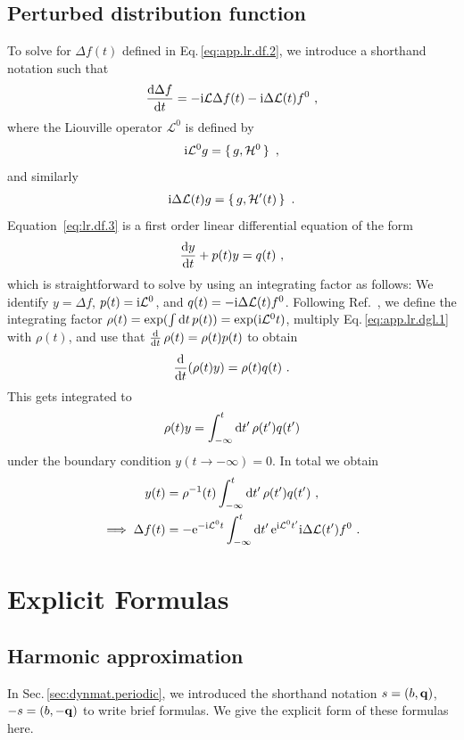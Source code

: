 \section{Perturbed distribution function}
\label{app:lr.f}
To solve for $\Delta f(t)$ defined in Eq.\,\eqref{eq:app.lr.df.2}, we introduce a shorthand notation such that
%
\begin{align}
  \frac{\d \Delta f}{\d t} = -\im \mathcal L \Delta f(t) - \im \Delta \mathcal L (t) f^0~,
  \label{eq:lr.df.3}
\end{align}
where the Liouville operator $\mathcal L^0$ is defined by
%
\begin{align}
	\im \mathcal  L^0 g = \set{g, \mathcal H^0}~,
	\label{eq:app.lr.L}
\end{align}
%
and similarly
\begin{align}
	\im \Delta \mathcal L (t) g = \set{g, \mathcal H'(t)}~.
	\label{eq:app.lr.L'}
\end{align}
Equation~\eqref{eq:lr.df.3} is a first order linear differential equation of the form
\begin{align}
	\frac{\d y}{\d t} + p(t) y = q(t)~,
	\label{eq:app.lr.dgl.1}
\end{align}
which is straightforward to solve by using an integrating factor as follows: We identify $y = \Delta f$, $p(t) = {\rm i} \mathcal L^0$, and $q(t) = - {\rm i} \Delta \mathcal L (t) f^0$. Following Ref.~\cite[p.\,68]{Lomen1986}, we define the integrating factor \mbox{$\rho (t) = \exp(\int {\rm d} t \, p (t)) = \exp ({\rm i} \mathcal L^0 t)$}, multiply Eq.\,\eqref{eq:app.lr.dgl.1} with $\rho (t)$, and use that \mbox{$\frac{{\rm d}}{{\rm d} t} \, \rho(t) = \rho(t) p(t)$} to obtain
$$
  \frac{{\rm d}}{{\rm d} t} (\rho (t) y) = \rho(t) q(t)~.
$$
This gets integrated to
$$
\rho(t) y = \int_{-\infty}^t {\rm d} t' \, \rho(t') q(t')
$$
under the boundary condition $y (t \to -\infty) = 0$. In total we obtain
%
\begin{align}
  y(t) 
    &= \rho^{-1} (t) \int_{-\infty}^t {\rm d} t' \, \rho(t') q(t')~, \\
  \implies
  \Delta f(t) 
    &= - {\rm e}^{- {\rm i} \mathcal L^0 t}  \int_{-\infty}^t {\rm d} t' \, {\rm e}^{{\rm i} \mathcal L^0 t'} {\rm i} \Delta \mathcal L (t') f^0~.
\end{align}

\chapter{Explicit Formulas}
\section{Harmonic approximation}
\label{app:formulas.ha}
In Sec.\,\ref{sec:dynmat.periodic}, we introduced the shorthand notation $s=(b, {\bf q})$, $-s=(b, -{\bf q})$ to write brief formulas. We give the explicit form of these formulas here.

